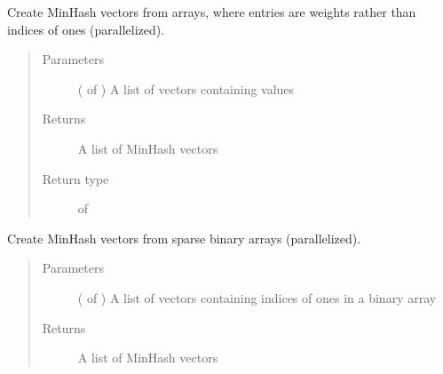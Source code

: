 \documentclass[letterpaper,10pt,english]{sphinxmanual}
\begin{document}
\begin{fulllineitems}
\begin{fulllineitems}
\label{\detokenize{documentation:tmap.Minhash.batch_from_int_weight_array}}
Create MinHash vectors from  arrays, where entries are weights rather than indices of ones (parallelized).
\begin{quote}\begin{description}
\item[{Parameters}] \leavevmode
{} ( of ) \textendash{} A list of vectors containing  values

\item[{Returns}] \leavevmode
A list of MinHash vectors

\item[{Return type}] \leavevmode
{} of 

\end{description}\end{quote}

\end{fulllineitems}


\begin{fulllineitems}
\label{\detokenize{documentation:tmap.Minhash.batch_from_sparse_binary_array}}
Create MinHash vectors from sparse binary arrays (parallelized).
\begin{quote}\begin{description}
\item[{Parameters}] \leavevmode
{} ( of ) \textendash{} A list of vectors containing indices of ones in a binary array

\item[{Returns}] \leavevmode
A list of MinHash vectors


\end{description}
\end{quote}
\end{fulllineitems}
\end{fulllineitems}
\end{document}
